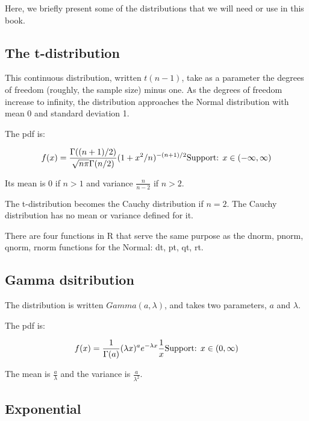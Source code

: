 \documentclass[12pt,]{krantz}
\begin{document}
Here, we briefly present some of the distributions that we will need or use in this book.

\hypertarget{the-t-distribution}{%
\subsection{The t-distribution}\label{the-t-distribution}}

This continuous distribution, written \(t(n-1)\), take as a parameter the degrees of freedom (roughly, the sample size) minus one. As the degrees of freedom increase to infinity, the distribution approaches the Normal distribution with mean 0 and standard deviation 1.

The pdf is:

\begin{equation}
f(x) = \frac{\Gamma((n+1)/2)}{\sqrt{n\pi} \Gamma(n/2)} (1+x^2/n)^{-(n+1)/2} \hbox{Support: } x \in (-\infty, \infty)
\end{equation}

Its mean is \(0\) if \(n>1\) and variance \(\frac{n}{n-2}\) if \(n>2\).

The t-distribution becomes the Cauchy distribution if \(n=2\). The Cauchy distribution has no mean or variance defined for it.

There are four functions in R that serve the same purpose as the dnorm, pnorm, qnorm, rnorm functions for the Normal:
dt, pt, qt, rt.

\hypertarget{gamma-dsitribution}{%
\subsection{Gamma dsitribution}\label{gamma-dsitribution}}

The distribution is written \(Gamma(a,\lambda)\), and takes two parameters, \(a\) and \(\lambda\).

The pdf is:

\begin{equation}
f(x) = \frac{1}{\Gamma(a)}(\lambda x)^ae^{-\lambda x}\frac{1}{x} \hbox{Support: } x \in (0, \infty)
\end{equation}

The mean is \(\frac{a}{\lambda}\) and the variance is \(\frac{a}{\lambda^2}\).

\hypertarget{exponential}{%
\subsection{Exponential}\label{exponential}}
\end{document}
